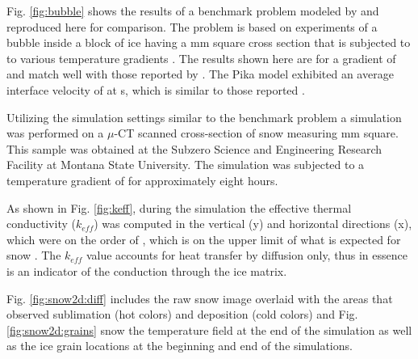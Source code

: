 Fig. \ref{fig:bubble} shows the results of a benchmark problem modeled by \citet{kaempfer2009phase} and reproduced here for comparison. The problem is based on experiments of a bubble inside a block of ice having a \unit[5]{mm} square cross section that is subjected to to various temperature gradients \citep{nakaya1956technical, stehle1965technical}. The results shown here are for a gradient of  and match well with those reported by \citet{kaempfer2009phase}. The Pika model exhibited an average interface velocity of  at \unit[7200]{s}, which is similar to those reported \citet{kaempfer2009phase}.


Utilizing the simulation settings similar to the benchmark problem a simulation was performed on a $\mu$-CT scanned cross-section of snow measuring \unit[5]{mm} square. This sample was obtained at the Subzero Science and Engineering Research Facility at Montana State University. The simulation was subjected to a temperature gradient of  for approximately eight hours.

As shown in Fig. \ref{fig:keff}, during the simulation the effective thermal conductivity ($k_{eff}$) was computed in the vertical (y) and horizontal directions (x), which were on the order of , which is on the upper limit of what is expected for snow \citep{sturm1997thermal}. The $k_{eff}$ value accounts for heat transfer by diffusion only, thus in essence is an indicator of the conduction through the ice matrix.

Fig. \ref{fig:snow2d:diff} includes the raw snow image overlaid with the areas that observed sublimation (hot colors) and deposition (cold colors) and Fig. \ref{fig:snow2d:grains} snow the temperature field at the end of the simulation as well as the ice grain locations at the beginning and end of the simulations.

